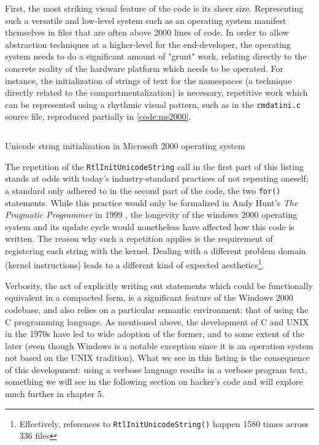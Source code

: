 First, the most striking visual feature of the code is its sheer size. Representing such a versatile and low-level system such as an operating system manifest themselves in files that are often above 2000 lines of code. In order to allow abstraction techniques at a higher-level for the end-developer, the operating system needs to do a significant amount of "grunt" work, relating directly to the concrete reality of the hardware platform which needs to be operated. For instance, the initialization of strings of text for the namespaces (a technique directly related to the compartmentalization) is necessary, repetitive work which can be represented using a rhythmic visual pattern, such as in the \lstinline{cmdatini.c} source file, reproduced partially in \ref{code:ms2000}.

\begin{listing}
  \inputminted[fontsize=\footnotesize, breaklines, breakanywhere]{c}{./corpus/ms2000.c}
  \caption{Unicode string initialization in Microsoft 2000 operating system}
  \label{code:ms2000}
\end{listing}

The repetition of the \lstinline{RtlInitUnicodeString} call in the first part of this listing stands at odds with today's industry-standard practices of not repeating oneself; a standard only adhered to in the second part of the code, the two \lstinline{for()} statements. While this practice would only be formalized in Andy Hunt's \emph{The Pragmatic Programmer} in 1999 \citep{hunt_pragmatic_1999}, the longevity of the windows 2000 operating system and its update cycle would nonetheless have affected how this code is written. The reason why such a repetition applies is the requirement of registering each string with the kernel. Dealing with a different problem domain (kernel instructions) leads to a different kind of expected aesthetics\footnote{Effectively, references to \lstinline{RtlInitUnicodeString()} happen 1580 times across 336 files}.

Verbosity, the act of explicitly writing out statements which could be functionally equivalent in a compacted form, is a significant feature of the Windows 2000 codebase, and also relies on a particular semantic environment: that of using the C programming language. As mentioned above, the development of C and UNIX in the 1970s have led to wide adoption of the former, and to some extent of the later (even though Windows is a notable exception since it is an operation system not based on the UNIX tradition). What we see in this listing is the consequence of this development: using a verbose language results in a verbose program text, something we will see in the following section on hacker's code and will explore much further in chapter 5.

